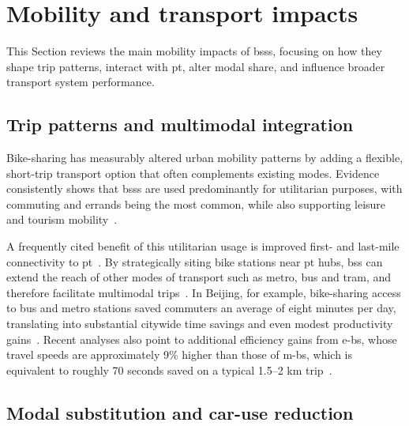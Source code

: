 \section{Mobility and transport impacts}
\label{sec:mobility_and_transport_impacts}

This Section reviews the main mobility impacts of \acp{bss}, focusing on how they shape trip patterns, interact with \ac{pt}, alter modal share, and influence broader transport system performance.

    \subsection{Trip patterns and multimodal integration}

Bike-sharing has measurably altered urban mobility patterns by adding a flexible, short-trip transport option that often complements existing modes. Evidence consistently shows that \acp{bss} are used predominantly for utilitarian purposes, with commuting and errands being the most common, while also supporting leisure and tourism mobility~\cite{Ricci2015}.

A frequently cited benefit of this utilitarian usage is improved first- and last-mile connectivity to \ac{pt}~\cite{Shaheen2010, Qiu2018}. By strategically siting bike stations near \ac{pt} hubs, \ac{bss} can extend the reach of other modes of transport such as metro, bus and tram, and therefore facilitate multimodal trips~\cite{Cheng2022}. In Beijing, for example, bike-sharing access to bus and metro stations saved commuters an average of eight minutes per day, translating into substantial citywide time savings and even modest productivity gains~\cite{Qiu2018}. Recent analyses also point to additional efficiency gains from \acp{e-b}, whose travel speeds are approximately 9\% higher than those of \acp{m-b}, which is equivalent to roughly 70 seconds saved on a typical 1.5–2 km trip~\cite{Waldner2025}. 

    \subsection{Modal substitution and car-use reduction}

